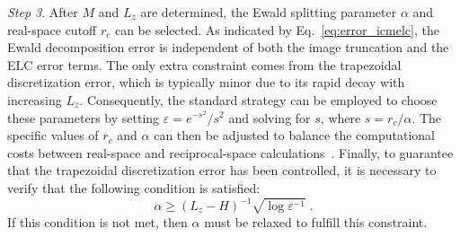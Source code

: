 \emph{Step 3}. After $M$ and $L_z$ are determined, the Ewald splitting parameter $\alpha$ and real-space cutoff $r_c$ can be selected. 
As indicated by Eq.~\eqref{eq:error_icmelc}, the Ewald decomposition error is independent of both the image truncation and the ELC error terms. 
The only extra constraint comes from the trapezoidal discretization error, which is typically minor due to its rapid decay with increasing $L_z$.
Consequently, the standard strategy can be employed to choose these parameters by setting $\varepsilon = e^{-s^2}/s^2$ and solving for $s$, where $s=r_c/\alpha$. 
The specific values of $r_c$ and $\alpha$ can then be adjusted to balance the computational costs between real-space and reciprocal-space calculations~\cite{frenkel2023understanding}.
Finally, to guarantee that the trapezoidal discretization error has been controlled, it is necessary to verify that the following condition is satisfied: 
\begin{equation}
    \alpha \geq (L_z-H)^{-1}\sqrt{\log\varepsilon^{-1}}\;.
\end{equation}
If this condition is not met, then $\alpha$ must be relaxed to fulfill this constraint.

